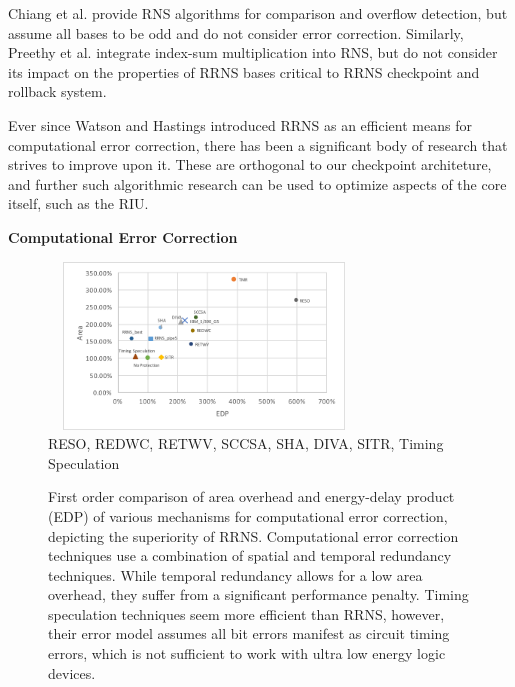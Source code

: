 \documentclass{sig-alternate}
\begin{document}
Chiang et al. \cite{JSHIUN_FP} provide RNS algorithms for comparison and overflow detection, but assume all bases to be odd and do not consider error correction. Similarly, Preethy et al. \cite{preethy1999,preethy2000rns} integrate index-sum multiplication into RNS, but do not consider its impact on the properties of RRNS bases critical to RRNS checkpoint  and rollback system.

Ever since Watson and Hastings \cite{Hastings,WatsonThesis,WatsonHastings} introduced RRNS as an efficient means for computational error correction, there has been a significant body of research \cite{tay2016non,bajard2016multi,xiao2016new,xiao2015error,chang2015residue,tay2014new,yin2013new,lo2013parallel,sengupta2013performance,haron2011redundant,tang2010new,goh2008multiple,sweidan2001theory,goldreich1999chinese,katti1996new,krishna1994computational,di1993systolic,krishna1992coding,sun1992coding,sun1992superfast,orton1992new,su1990algorithm,ramachandran1983single,etzel1980redundant,barsi1974error,yau1973error,rao1970biresidue,szabo1967residue} that strives to improve upon it. These are orthogonal to our checkpoint  architeture, and further such algorithmic research can be used to optimize aspects of the core itself, such as the RIU.

\textbf{Computational Error Correction}

\begin{figure}[H]
\begin{center}
\setlength{\abovecaptionskip}{-0.2mm} 
\includegraphics[width=3.25in,height=1.75in]{graphics/RelatedComp.pdf}
\\
\scriptsize{RESO\cite{RESO}, REDWC\cite{REDWC}, RETWV\cite{RETWV}, SCCSA\cite{SCCSA}, SHA\cite{SHA}, DIVA\cite{DIVA}, SITR\cite{SITR}, Timing Speculation\cite{razor_2003,decor_2008}}
\caption{First order comparison of area overhead and energy-delay product (EDP) of various mechanisms for computational error correction, depicting the superiority of RRNS. Computational error correction techniques use a combination of spatial and temporal redundancy techniques. While temporal redundancy allows for a low area overhead, they suffer from a significant performance penalty. Timing speculation techniques seem more efficient than RRNS, however, their error model assumes all bit errors manifest as circuit timing errors, which is not sufficient to work with ultra low energy logic devices.}
\label{fig:related}
\end{center}
\vspace{-3mm}
\end{figure}
\end{document}
